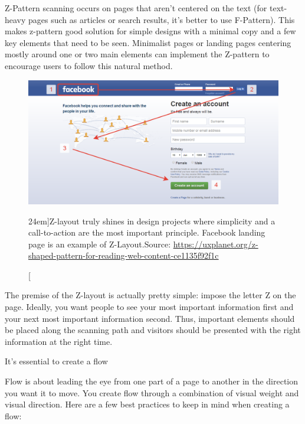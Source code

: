 Z-Pattern scanning occurs on pages that aren’t centered on the text (for text-heavy pages such as articles or search results, it’s better to use F-Pattern). This makes z-pattern good solution for simple designs with a minimal copy and a few key elements that need to be seen. Minimalist pages or landing pages centering mostly around one or two main elements can implement the Z-pattern to encourage users to follow this natural method.

\begin{figure}%
	\centering
  \includegraphics[width=1.55\textwidth]{../figures/z-shape_facebook.png}
  \caption[][24em]{Z-layout truly shines in design projects where simplicity and a call-to-action are the most important principle. Facebook landing page is an example of Z-Layout.\newline Source: \url{https://uxplanet.org/z-shaped-pattern-for-reading-web-content-ce1135f92f1c}}
  \label{fig:z-shape_facebook}
\end{figure}

The premise of the Z-layout is actually pretty simple: impose the letter Z on the page. Ideally, you want people to see your most important information first and your next most important information second. Thus, important elements should be placed along the scanning path and visitors should be presented with the right information at the right time.

It’s essential to create a flow

Flow is about leading the eye from one part of a page to another in the direction you want it to move. You create flow through a combination of visual weight and visual direction. Here are a few best practices to keep in mind when creating a flow:


